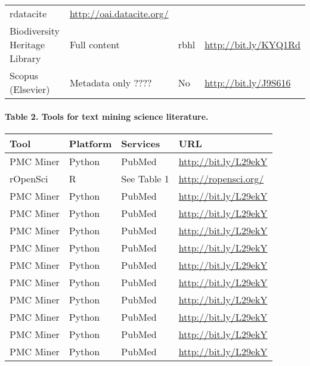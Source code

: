 \documentclass[author-year, review, 11pt]{components/elsarticle} %
\begin{document}
\begin{longtable}[]{@{}llll@{}}
\begin{minipage}[t]{0.10\columnwidth}
rdatacite\strut
\end{minipage} & \begin{minipage}[t]{0.19\columnwidth}\raggedright\strut
\url{http://oai.datacite.org/}\strut
\end{minipage}\tabularnewline
\begin{minipage}[t]{0.36\columnwidth}\raggedright\strut
Biodiversity Heritage Library\strut
\end{minipage} & \begin{minipage}[t]{0.23\columnwidth}\raggedright\strut
Full content\strut
\end{minipage} & \begin{minipage}[t]{0.10\columnwidth}\raggedright\strut
rbhl\strut
\end{minipage} & \begin{minipage}[t]{0.19\columnwidth}\raggedright\strut
\url{http://bit.ly/KYQ1Rd}\strut
\end{minipage}\tabularnewline
\begin{minipage}[t]{0.36\columnwidth}\raggedright\strut
Scopus (Elsevier)\strut
\end{minipage} & \begin{minipage}[t]{0.23\columnwidth}\raggedright\strut
Metadata only ????\strut
\end{minipage} & \begin{minipage}[t]{0.10\columnwidth}\raggedright\strut
No\strut
\end{minipage} & \begin{minipage}[t]{0.19\columnwidth}\raggedright\strut
\url{http://bit.ly/J9S616}\strut
\end{minipage}\tabularnewline
\bottomrule
\end{longtable}

\paragraph{Table 2. Tools for text mining science
literature.}\label{table-2.-tools-for-text-mining-science-literature.}

\begin{longtable}[]{@{}llll@{}}
\toprule
Tool & Platform & Services & URL\tabularnewline
\midrule
\endhead
PMC Miner & Python & PubMed & \url{http://bit.ly/L29ekY}\tabularnewline
rOpenSci & R & See Table 1 & \url{http://ropensci.org/}\tabularnewline
PMC Miner & Python & PubMed & \url{http://bit.ly/L29ekY}\tabularnewline
PMC Miner & Python & PubMed & \url{http://bit.ly/L29ekY}\tabularnewline
PMC Miner & Python & PubMed & \url{http://bit.ly/L29ekY}\tabularnewline
PMC Miner & Python & PubMed & \url{http://bit.ly/L29ekY}\tabularnewline
PMC Miner & Python & PubMed & \url{http://bit.ly/L29ekY}\tabularnewline
PMC Miner & Python & PubMed & \url{http://bit.ly/L29ekY}\tabularnewline
PMC Miner & Python & PubMed & \url{http://bit.ly/L29ekY}\tabularnewline
PMC Miner & Python & PubMed & \url{http://bit.ly/L29ekY}\tabularnewline
PMC Miner & Python & PubMed & \url{http://bit.ly/L29ekY}\tabularnewline
PMC Miner & Python & PubMed & \url{http://bit.ly/L29ekY}\tabularnewline
\bottomrule
\end{longtable}
\end{document}
